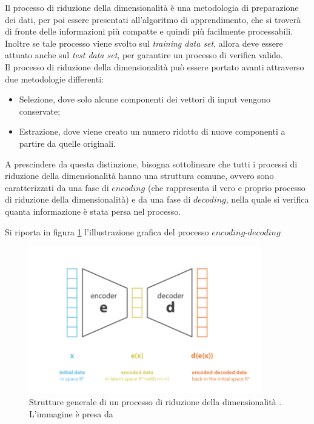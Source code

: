 Il processo di riduzione della dimensionalità è una metodologia di preparazione dei dati, per poi essere presentati all'algoritmo di apprendimento, che si troverà di fronte delle informazioni più compatte e quindi più facilmente processabili. Inoltre se tale processo viene svolto sul \textit{training data set}, allora deve essere attuato anche sul \textit{test data set}, per garantire un processo di verifica valido.\\
Il processo di riduzione della dimensionalità può essere portato avanti attraverso due metodologie differenti:
\begin{itemize}
	\item Selezione, dove solo alcune componenti dei vettori di input vengono conservate;
	\item Estrazione, dove viene creato un numero ridotto di nuove componenti a partire da quelle originali.
\end{itemize}
A prescindere da questa distinzione, bisogna sottolineare che tutti i processi di riduzione della dimensionalità hanno una struttura comune, ovvero sono caratterizzati da una fase di $\textit{encoding}$ (che rappresenta il vero e proprio processo di riduzione della dimensionalità) e da una fase di $\textit{decoding}$, nella quale si verifica quanta informazione è stata persa nel processo. 

\newpage

Si riporta in figura \ref{encoder-decoder} l'illustrazione grafica del processo $\textit{encoding-decoding}$
\begin{figure}[h!]
	\centering
	\includegraphics[width=0.90\textwidth]{figs/encoder-decoder.png}
	\caption{Strutture generale di un processo di riduzione della dimensionalità . L'immagine è presa da \cite{Understanding_VAEs}}
	\label{encoder-decoder}
\end{figure}


